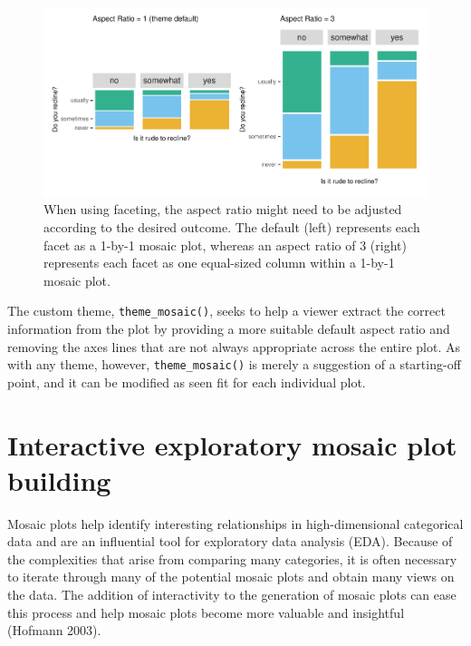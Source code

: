 \begin{figure}

{\centering \includegraphics[width=1\linewidth]{jeppson-hofmann_files/figure-latex/aspect-1} 

}

\caption{When using faceting, the aspect ratio might need to be adjusted according to the desired outcome. The default (left) represents each facet as a 1-by-1 mosaic plot, whereas an aspect ratio of 3 (right) represents each facet as one equal-sized column within a 1-by-1 mosaic plot.}\label{fig:aspect}
\end{figure}

The custom theme, \texttt{theme\_mosaic()}, seeks to help a viewer extract the correct information from the plot by providing a more suitable default aspect ratio and removing the axes lines that are not always appropriate across the entire plot. As with any theme, however, \texttt{theme\_mosaic()} is merely a suggestion of a starting-off point, and it can be modified as seen fit for each individual plot.

\hypertarget{interactive-exploratory-mosaic-plot-building}{%
\section*{Interactive exploratory mosaic plot building}\label{interactive-exploratory-mosaic-plot-building}}

Mosaic plots help identify interesting relationships in high-dimensional categorical data and are an influential tool for exploratory data analysis (EDA). Because of the complexities that arise from comparing many categories, it is often necessary to iterate through many of the potential mosaic plots and obtain many views on the data. The addition of interactivity to the generation of mosaic plots can ease this process and help mosaic plots become more valuable and insightful (Hofmann 2003).

